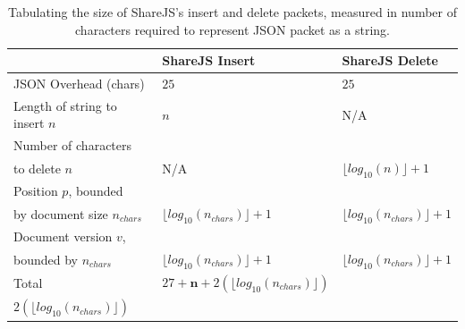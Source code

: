\documentclass[12pt,a4paper,twoside,openright]{report}
\begin{document}
			
			\begin{table}[H]
			\centering
			\caption[ShareJS Insert and Delete Packet Size]{Tabulating the size of ShareJS's insert and delete packets, measured in number of characters required to represent JSON packet as a string.}
			\label{tab:sharepackets}
			\setlength{\tabcolsep}{10pt}
			\begin{tabular}{@{}lll@{}}
                                             & ShareJS Insert             & ShareJS Delete     \\ \toprule
			JSON Overhead (chars)                                      & $25$                       & $25$               \\ \midrule
			Length of string to insert $n$                     & $n$                        & N/A             \\ \midrule
			Number of characters \\to delete $n$                 & N/A                        & $\lfloor log_{10}(n) \rfloor+1$ \\ \midrule
			Position $p$, bounded\\by document size $n_{chars}$ & $\lfloor log_{10}(n_{chars}) \rfloor+1$				 & $\lfloor log_{10}(n_{chars}) \rfloor+1$  \\ \midrule
			Document version $v$, \\bounded by $n_{chars}$       & $\lfloor log_{10}(n_{chars}) \rfloor+1$                 & $\lfloor log_{10}(n_{chars}) \rfloor+1$  \\ \bottomrule
			Total	 		& $27+\boldsymbol{n}+2(\lfloor log_{10}(n_{chars}) \rfloor)$ & \makecell{$28 + \lfloor log_{10}(n)\rfloor + $ \\ $2(\lfloor log_{10}(n_{chars}) \rfloor)$}
			\end{tabular}
			\end{table}	
			
\end{document}
